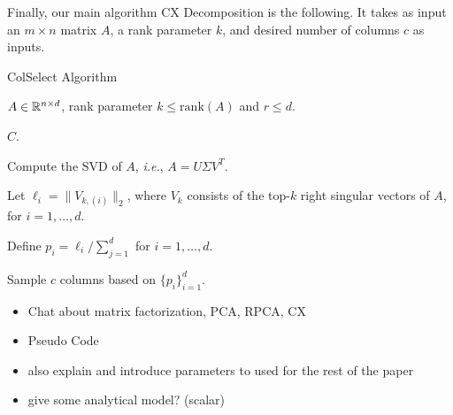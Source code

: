 Finally, our main algorithm {\sc CX Decomposition} is the following.  It takes as input an $m \times n$ matrix $A$, a rank parameter $k$, and desired number of columns $c$ as inputs.

 \begin{algorithm}[tb]
 \caption{{\sc ColSelect} Algorithm}
  \label{alg:cs}
  \begin{algorithmic}[1]
    \Require $A \in \mathbb{R}^{n\times d}$, rank parameter $k \leq \textrm{rank}(A)$ and $r\leq d$.

    \Ensure $C$.
    

    \State Compute the SVD of $A$, \emph{i.e.}, $A = U \Sigma V^T$.

    \State Let $\ell_i = \| V_{k,(i)}\|_2$, where $V_k$ consists of the top-$k$ right singular vectors of $A$, for $i = 1, \ldots, d$. 
    
    \State Define $p_i = \ell_i / \sum_{j=1}^d$ for $i=1,\ldots,d$.
    
    \State Sample $c$ columns based on $\{p_i\}_{i=1}^d$.

    

    \end{algorithmic}
\end{algorithm}


\begin{itemize}

  \item Chat about matrix factorization, PCA, RPCA, CX 

  \item Pseudo Code

  \item also explain and introduce parameters to used for the rest of the paper

  \item give some analytical model? (scalar)

\end{itemize}

